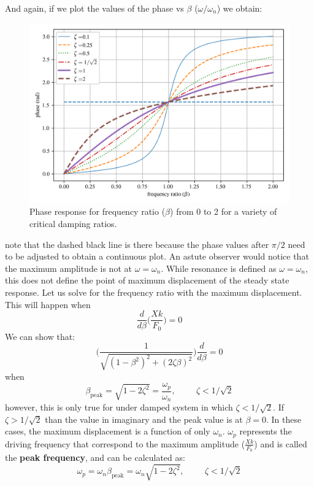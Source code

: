 \documentclass[12pt,letter]{article}
\numberwithin{ex}{section} %
\numberwithin{re}{section} %
\numberwithin{pr}{section} %
\begin{document}
			\noindent And again, if we plot the values of the phase vs $\beta$ ($\omega/\omega_n$) we obtain:
			\begin{figure}[H]
				\centering
				\includegraphics[]{../figures/underdamped_frequency_response_phase.png}
				\caption{Phase response for frequency ratio ($\beta$) from 0 to 2 for a variety of critical damping ratios.}
			\end{figure}				
			\noindent note that the dashed black line is there because the phase values after $\pi/2$ need to be adjusted to obtain a continuous plot. An astute observer would notice that the maximum amplitude is not at $\omega = \omega_n$. While resonance is defined as $\omega = \omega_n$, this does not define the point of maximum displacement of the steady state response. Let us solve for the frequency ratio with the maximum displacement. This will happen when
			\begin{equation}
				\frac{d}{d\beta}\Bigg(\frac{Xk}{F_0} \Bigg)= 0
			\end{equation}				
			We can show that:
			\begin{equation}
			\Bigg(\frac{1}{\sqrt{(1-\beta^2)^2+(2\zeta \beta)^2}}\Bigg)	\frac{d}{d\beta} =0
			\end{equation}	
			when 
			\begin{equation}
			\beta_{\text{peak}} = \sqrt{1-2 \zeta^2}= \frac{\omega_p}{\omega_n}, \hspace{1cm} \zeta<1/\sqrt{2} 
			\end{equation}				
			however, this is only true for under damped system in which $\zeta<1/\sqrt{2}$. If $\zeta>1/\sqrt{2}$ than the value in imaginary and the peak value is at $\beta=0$. In these cases, the maximum displacement is a function of only $\omega_n$. $\omega_p$ represents the driving frequency that correspond to the maximum amplitude ($\frac{Xk}{F_0}$) and is called the \textbf{peak frequency}, and can be calculated as:
			\begin{equation}
			\omega_p = \omega_n \beta_{\text{peak}} = \omega_n \sqrt{1-2 \zeta^2}, \hspace{1cm} \zeta<1/\sqrt{2} 
			\end{equation}				
			
\end{document}
